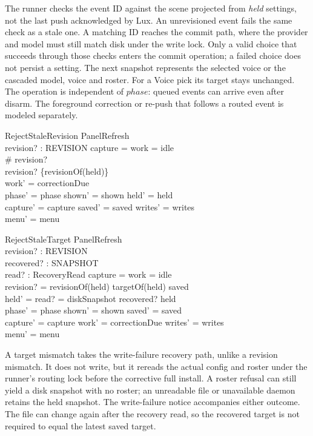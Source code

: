 \documentclass[a4paper,10pt,fleqn]{article}
\begin{document}
The runner checks the event ID against the scene projected from
\emph{held} settings, not the last push acknowledged by Lux. An
unrevisioned event fails the same check as a stale one. A matching ID
reaches the commit path, where the provider and model must still
match disk under the write lock. Only a valid choice that succeeds
through those checks enters the commit operation; a failed choice
does not persist a setting. The next snapshot represents the selected
voice or the cascaded model, voice and roster. For a Voice pick its
target stays unchanged. The operation is independent of $phase$:
queued events can arrive even after disarm. The foreground correction
or re-push that follows a routed event is modeled separately.

\begin{schema}{RejectStaleRevision}
  \Delta PanelRefresh \\
  revision? : \power REVISION
\where
  capture = \emptyset \land work = idle \\
  \# revision?  \\
  revision? \neq \{revisionOf(held)\} \\
  work' = correctionDue \\
  phase' = phase \land shown' = shown \land held' = held \\
  capture' = capture \land saved' = saved \land writes' = writes \\
  menu' = menu
\end{schema}

\begin{schema}{RejectStaleTarget}
  \Delta PanelRefresh \\
  revision? : REVISION \\
  recovered? : SNAPSHOT \\
  read? : RecoveryRead
\where
  capture = \emptyset \land work = idle \\
  revision? = revisionOf(held) \land targetOf(held) \neq saved \\
  held' = \IF read? = diskSnapshot \THEN recovered? \ELSE held \\
  phase' = phase \land shown' = shown \land saved' = saved \\
  capture' = capture \land work' = correctionDue \land writes' = writes \\
  menu' = menu
\end{schema}

A target mismatch takes the write-failure recovery path, unlike a
revision mismatch. It does not write, but it rereads the actual
config and roster under the runner's routing lock before the
corrective full install. A roster refusal can still yield a disk
snapshot with no roster; an unreadable file or unavailable daemon
retains the held snapshot. The write-failure notice accompanies either
outcome. The file can change again after the recovery read, so the
recovered target is not required to equal the latest saved target.
\end{document}
